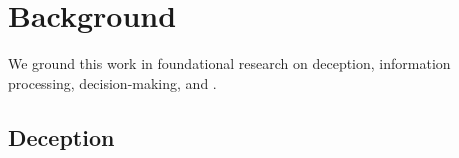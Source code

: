 \section{Background}
\label{sec:background}

We ground this work in foundational research on deception, information processing, decision-making, and \MR. 

\subsection{Deception}



